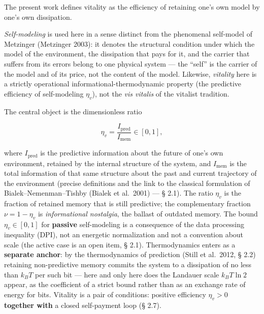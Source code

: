 \documentclass[pdflatex,sn-mathphys-ay]{sn-jnl}
\begin{document}
The present work defines vitality as the efficiency of retaining one's own model by one's own dissipation.

\emph{Self-modeling} is used here in a sense distinct from the phenomenal self-model of Metzinger (Metzinger 2003): it denotes the structural condition under which the model of the environment, the dissipation that pays for it, and the carrier that suffers from its errors belong to one physical system --- the ``self'' is the carrier of the model and of its price, not the content of the model. Likewise, \emph{vitality} here is a strictly operational informational-thermodynamic property (the predictive efficiency of self-modeling \(\eta_v\)), not the \emph{vis vitalis} of the vitalist tradition.

The central object is the dimensionless ratio

\[\eta_v = \frac{I_{\text{pred}}}{I_{\text{mem}}} \in [0, 1],\]

where \(I_{\text{pred}}\) is the predictive information about the future of one's own environment, retained by the internal structure of the system, and \(I_{\text{mem}}\) is the total information of that same structure about the past and current trajectory of the environment (precise definitions and the link to the classical formulation of Bialek--Nemenman--Tishby (Bialek et al.~2001) --- § 2.1). The ratio \(\eta_v\) is the fraction of retained memory that is still predictive; the complementary fraction \(\nu = 1 - \eta_v\) is \emph{informational nostalgia}, the ballast of outdated memory. The bound \(\eta_v \in [0, 1]\) for \textbf{passive} self-modeling is a consequence of the data processing inequality (DPI), not an energetic normalization and not a convention about scale (the active case is an open item, § 2.1). Thermodynamics enters as a \textbf{separate anchor}: by the thermodynamics of prediction (Still et al.~2012, § 2.2) retaining non-predictive memory commits the system to a dissipation of no less than \(k_B T\) per such bit --- here and only here does the Landauer scale \(k_B T \ln 2\) appear, as the coefficient of a strict bound rather than as an exchange rate of energy for bits. Vitality is a pair of conditions: positive efficiency \(\eta_v > 0\) \textbf{together with} a closed self-payment loop (§ 2.7).
\end{document}
